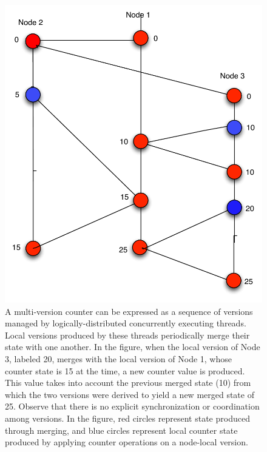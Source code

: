 \begin{figure}
  \begin{center}
    \includegraphics[scale=0.35]{Figures/dali-counter}
  \end{center}
  \caption{\small A multi-version counter can be expressed as a
    sequence of versions managed by logically-distributed concurrently
    executing threads.  Local versions produced by these threads
    periodically merge their state with one another.  In the figure,
    when the local version of Node 3, labeled 20, merges with the
    local version of Node 1, whose counter state is 15 at the time, a
    new counter value is produced.  This value takes into account the
    previous merged state (10) from which the two versions were
    derived to yield a new merged state of 25.  Observe that there is
    no explicit synchronization or coordination among versions.  In
    the figure, red circles represent state produced through merging,
    and blue circles represent local counter state produced by
    applying counter operations on a node-local version.  }
\end{figure}

